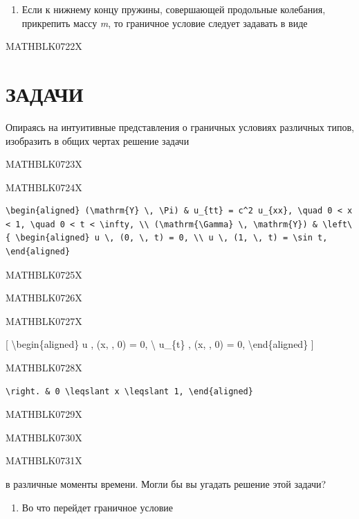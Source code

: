 \documentclass[
]{article}
\providecommand{\tightlist}{%
  \setlength{\itemsep}{0pt}\setlength{\parskip}{0pt}}
\begin{document}
\begin{enumerate}
\def\labelenumi{\arabic{enumi}.}
\setcounter{enumi}{2}
\tightlist
\item
  Если к нижнему концу пружины, совершающей продольные колебания,
  прикрепить массу \emph{m}, то граничное условие следует задавать в
  виде
\end{enumerate}

MATHBLK0722X

\section{ЗАДАЧИ}\label{ux437ux430ux434ux430ux447ux438-4}

Опираясь на интуитивные представления о граничных условиях различных
типов, изобразить в общих чертах решение задачи

MATHBLK0723X

MATHBLK0724X

\begin{verbatim}
\begin{aligned} (\mathrm{Y} \, \Pi) & u_{tt} = c^2 u_{xx}, \quad 0 < x < 1, \quad 0 < t < \infty, \\ (\mathrm{\Gamma} \, \mathrm{Y}) & \left\{ \begin{aligned} u \, (0, \, t) = 0, \\ u \, (1, \, t) = \sin t, \end{aligned}
\end{verbatim}

MATHBLK0725X

MATHBLK0726X

MATHBLK0727X

{[} \textbackslash begin\{aligned\} u , (x, , 0) = 0, \textbackslash{}
u\_\{t\} , (x, , 0) = 0, \textbackslash end\{aligned\} {]}

MATHBLK0728X

\begin{verbatim}
\right. & 0 \leqslant x \leqslant 1, \end{aligned}
\end{verbatim}

MATHBLK0729X

MATHBLK0730X

MATHBLK0731X

в различные моменты времени. Могли бы вы угадать решение этой задачи?

\begin{enumerate}
\def\labelenumi{\arabic{enumi}.}
\setcounter{enumi}{2}
\tightlist
\item
  Во что перейдет граничное условие
\end{enumerate}
\end{document}
